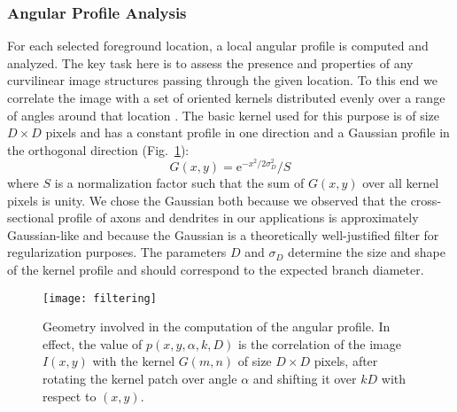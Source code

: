 \documentclass[twocolumn,natbib]{svjour3}
\begin{document}
\subsubsection{Angular Profile Analysis}
\label{subsubsec:angular-profile}
For each selected foreground location, a local angular profile is computed and analyzed. The key task here is to assess the presence and properties of any curvilinear image structures passing through the given location. To this end we correlate the image with a set of oriented kernels distributed evenly over a range of angles around that location \citep{radojevic2014fuzzy}. The basic kernel used for this purpose is of size $D\times D$ pixels and has a constant profile in one direction and a Gaussian profile in the orthogonal direction (Fig.~\ref{fig:directional-filtering}):
\begin{equation}
G(x,y)=\textrm{e}^{-x^2/2\sigma_{\!\!D}^{2}}/S
\label{eq:G}
\end{equation}
where $S$ is a normalization factor such that the sum of $G(x,y)$ over all kernel pixels is unity. We chose the Gaussian both because we observed that the cross-sectional profile of axons and dendrites in our applications is approximately Gaussian-like and because the Gaussian is a theoretically well-justified filter for regularization purposes. The parameters $D$ and $\sigma_{\!D}$ determine the size and shape of the kernel profile and should correspond to the expected branch diameter.

\begin{figure}[!t]
\centering
\texttt{[image: filtering]}
\caption{Geometry involved in the computation of the angular profile. In effect, the value of $p(x,y,\alpha,k,D)$ is the correlation of the image $I(x,y)$ with the kernel $G(m,n)$ of size $D\times D$ pixels, after rotating the kernel patch over angle $\alpha$ and shifting it over $kD$ with respect to $(x,y)$.}
\label{fig:directional-filtering}
\end{figure}
\end{document}
